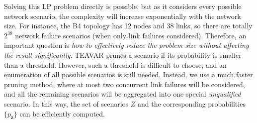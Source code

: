 \documentclass[sigconf]{acmart}
\begin{document}
Solving this LP problem directly is possible, but as it considers every possible network scenario, 
the complexity will increase exponentially with the network size.
For instance, the B4 topology \cite{B4} has 12 nodes and 38 links,
so there are totally $2^{38}$ network failure scenarios (when only link failures considered).
Therefore, an important question is \textit{how to effectively reduce the problem size without 
affecting the result significantly}. 
TEAVAR \cite{Teavar} prunes a scenario if its probability is smaller than a threshold. However, such a threshold is difficult to choose, and an enumeration of all 
possible scenarios is still needed. Instead, we use a much faster pruning method, 
where at most two concurrent link failures will be considered, 
and all the remaining scenarios will be aggregated into one special \textit{unqualified} scenario. 
In this way, the set of scenarios $Z$ and the corresponding probabilities $\{p_\mathbf{z}\}$ can be efficiently computed. 
\end{document}
